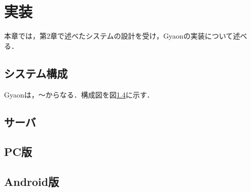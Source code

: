 \chapter{実装}
\label{chap:implementation}

本章では，第2章で述べたシステムの設計を受け，Gyaonの実装について述べる．

\newpage

\section{システム構成}
Gyaonは，〜からなる．構成図を図\ref{}に示す．



\section{サーバ}

\section{PC版}

\section{Android版}
